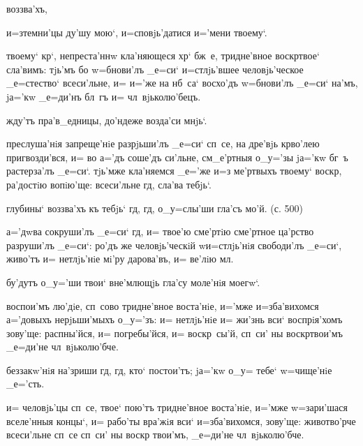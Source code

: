 
  воззва'хъ, 

  и=з\ъ темни'цы ду'шу мою`, 
и=сповjь'датися и='мени твоему`.

 твоему` кр`, непреста'ннw 
кла'няющеся хр` бж~е, тридне'вное воскр твое` 
сла'вимъ: тjь'мъ бо w=бнови'лъ _е=си` и=стлjь'вшее 
человjь'ческое _е=стество` всеси'льне, и= и='же на нб~са` 
восхо'дъ w=бнови'лъ _е=си` на'мъ, jа='кw _е=ди'нъ бл~гъ 
и= чл~вjьколю'бецъ.

  жду'тъ пра'в_едницы, до'ндеже 
возда'си мнjь`.

 преслуша'нiя запреще'нiе разрjьши'лъ _е=си` 
сп~се, на дре'вjь кр во'лею пригвозди'вся, и= во 
а='дъ соше'дъ си'льне, см_е'ртныя о_у='зы jа='кw бг~ъ 
растерза'лъ _е=си`. тjь'мже кла'няемся _е='же и=з\ъ 
ме'ртвыхъ твоему` воскр, ра'достiю вопiю'ще: 
всеси'льне гд, сла'ва тебjь`.

  глубины` воззва'хъ къ тебjь` гд, 
гд, о_у=слы'ши гла'съ мо'й. (с. 500)

 а='дwва сокруши'лъ _е=си` гд, и= твое'ю 
сме'ртiю сме'ртное ца'рство разруши'лъ _е=си`: ро'дъ же 
человjь'ческiй w\т и=стлjь'нiя свободи'лъ _е=си`, живо'тъ 
и= нетлjь'нiе мi'ру дарова'въ, и= ве'лiю мл.


  бу'дутъ о_у='ши твои` вне'млющjь гла'су 
моле'нiя моегw`.

 воспои'мъ лю'дiе, сп~сово тридне'вное 
воста'нiе, и='мже и=зба'вихомся а='довыхъ нерjьши'мыхъ 
о_у='зъ: и= нетлjь'нiе и= жи'знь вси` воспрiя'хомъ 
зову'ще: распны'йся, и= погребы'йся, и= воскр~сы'й, 
сп~си' ны воскр твои'мъ _е=ди'не чл~вjьколю'бче.

  беззакw'нiя на'зриши гд, гд, 
кто` постои'тъ; jа='кw о_у= тебе` w=чище'нiе _е='сть.

 и= человjь'цы сп~се, твое` пою'тъ 
тридне'вное воста'нiе, и='мже w=зари'шася вселе'нныя 
концы`, и= рабо'ты вра'жiя вси` и=зба'вихомся, зову'ще: 
животво'рче всеси'льне сп~се сп~си' ны воскр 
твои'мъ, _е=ди'не чл~вjьколю'бче.

